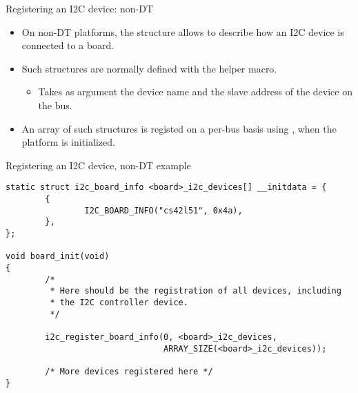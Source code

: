 \begin{frame}{Registering an I2C device: non-DT}
  \begin{itemize}
  \item On non-DT platforms, the  structure
    allows to describe how an I2C device is connected to a board.
  \item Such structures are normally defined with the
     helper macro.
    \begin{itemize}
    \item Takes as argument the device name and the slave address of
      the device on the bus.
    \end{itemize}
  \item An array of such structures is registed on a per-bus basis
    using , when the platform is
    initialized.
  \end{itemize}
\end{frame}

\begin{frame}[fragile]{Registering an I2C device, non-DT example}
  \begin{block}{}
    \begin{verbatim}
static struct i2c_board_info <board>_i2c_devices[] __initdata = {
        {
                I2C_BOARD_INFO("cs42l51", 0x4a),
        },
};

void board_init(void)
{
        /*
         * Here should be the registration of all devices, including
         * the I2C controller device.
         */

        i2c_register_board_info(0, <board>_i2c_devices,
                                ARRAY_SIZE(<board>_i2c_devices));

        /* More devices registered here */
}
    \end{verbatim}
  \end{block}
\end{frame}

